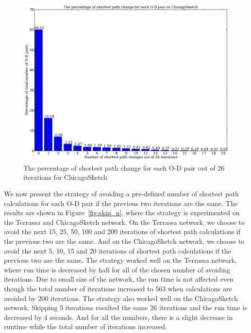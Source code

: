 \begin{figure}[H]
    \centering
    \includegraphics[width=\textwidth]{img/sp_change}
    \caption{The percentage of shortest path change for each O-D pair out of 26 iterations for ChicagoSketch}
    \label{fig:sp_change}
\end{figure}

We now present the strategy of avoiding a pre-defined number of shortest path calculations for each O-D pair if the previous two iterations are the same.
The results are shown in Figure~\ref{fig:skip_n},
where the strategy is experimented on the Terrassa and ChicagoSketch network.
On the Terrassa network,
we choose to avoid the next 15, 25, 50, 100 and 200 iterations of shortest path calculations if the previous two are the same.
And on the ChicagoSketch network,
we choose to avoid the next 5, 10, 15 and 20 iterations of shortest path calculations if the previous two are the same.
The strategy worked well on the Terrassa network,
where run time is decreased by half for all of the chosen number of avoiding iterations.
Due to small size of the network,
the run time is not affected even though the total number of iterations increased to 563 when calculations are avoided by 200 iterations.
The strategy also worked well on the ChicagoSketch network.
Skipping 5 iterations resulted the same 26 iterations and the run time is decreased by 4 seconds.
And for all the numbers,
there is a slight decrease in runtime while the total number of iterations increased.

